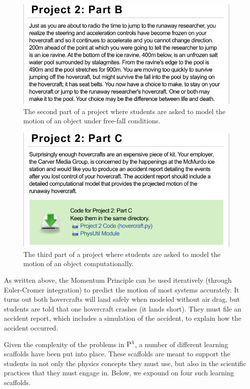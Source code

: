 \documentclass{msuphddissertation}
\begin{document}
\begin{doublespace}
\begin{figure}
\centering
\includegraphics[width=1\linewidth]{./images/partb.pdf}
\caption{The second part of a project where students are asked to model the motion of an object under free-fall conditions.}\label{fig:p2pb}
\end{figure}

\begin{figure}
\centering
\includegraphics[width=1\linewidth]{./images/partc.pdf}
\caption{The third part of a project where students are asked to model the motion of an object computationally.}\label{fig:p2pc}
\end{figure}

As written above, the Momentum Principle can be used iteratively (through Euler-Cromer integration) to predict the motion of most systems accurately.\cite{Cromer:1981vm}  It turns out both hovercrafts will land safely when modeled without air drag, but students are told that one hovercraft crashes (it lands short). They must file an accident report, which includes a simulation of the accident, to explain how the accident occurred.

Given the complexity of the problems in ${\rm P}^{3}$, a number of different learning scaffolds have been put into place.  These scaffolds are meant to support the students in not only the physics concepts they must use, but also in the scientific practices that they must engage in.  Below, we expound on four such learning scaffolds.


\end{doublespace}
\end{document}
